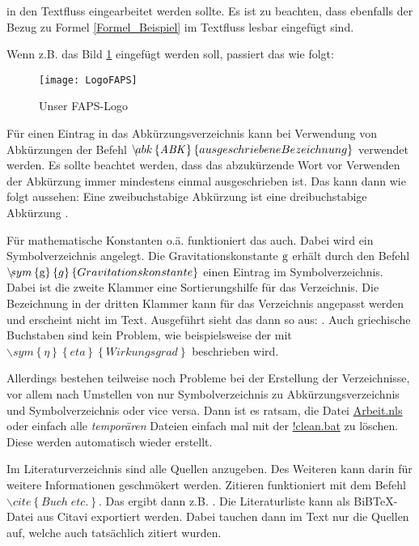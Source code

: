 in den Textfluss eingearbeitet werden sollte. Es ist zu beachten, dass ebenfalls der Bezug zu Formel
\eqref{Formel_Beispiel} im Textfluss lesbar eingefügt sind.

Wenn z.B. das Bild \ref{Bild_Beispiel} eingefügt werden soll, passiert das wie
folgt:
\begin{figure}[ht!]
	\centering
 	\texttt{[image: LogoFAPS]}
	\caption{Unser FAPS-Logo}
	\label{Bild_Beispiel}
\end{figure}

Für einen Eintrag in das Abkürzungsverzeichnis kann bei Verwendung von
Abkürzungen der Befehl $\backslash\!abk\left\{\text{\emph{ABK}}\right\}\left\{ausgeschriebene Bezeichnung\right\}$ verwendet werden. Es sollte
beachtet werden, dass das abzukürzende Wort vor Verwenden der Abkürzung immer
mindestens einmal ausgeschrieben ist.
Das kann dann wie folgt aussehen: Eine zweibuchstabige Abkürzung  ist eine dreibuchstabige Abkürzung .

Für mathematische Konstanten o.ä. funktioniert das auch. Dabei wird ein
Symbolverzeichnis angelegt. Die Gravitationskonstante $\textnormal{g}$ erhält durch
den Befehl $\backslash\!sym\left\{\textnormal{g}\right\}\left\{g\right\}\left\{Gravitationskonstante\right\}$ einen Eintrag im Symbolverzeichnis. Dabei ist die zweite Klammer eine Sortierungshilfe für das Verzeichnis. Die Bezeichnung in der dritten Klammer kann für das Verzeichnis angepasst werden und erscheint nicht im Text. Ausgeführt sieht das dann so aus: . Auch griechische Buchstaben sind kein Problem, wie beispielsweise der  mit $\backslash\!sym\left\{\eta\right\}\left\{eta\right\}\left\{Wirkungsgrad\right\}$ beschrieben wird.


Allerdings bestehen teilweise noch Probleme bei der Erstellung der
Verzeichnisse, vor allem nach Umstellen von nur Symbolverzeichnis zu
Abkürzungsverzeichnis und Symbolverzeichnis oder vice versa. Dann ist es ratsam,
die Datei \url{Arbeit.nls} oder einfach alle \emph{temporären} Dateien einfach mal mit der \url{!clean.bat} zu löschen. Diese werden automatisch wieder erstellt.

Im Literaturverzeichnis sind alle Quellen anzugeben. Des Weiteren kann darin für weitere Informationen geschmökert werden.
Zitieren funktioniert mit dem Befehl $\backslash\!cite\left\{ Buch\;etc.
\right\}$. Das ergibt dann z.B. \cite{Resetarics.2009}. Die Literaturliste kann als BiBTeX-Datei aus Citavi exportiert werden. Dabei tauchen dann im Text nur die Quellen auf, welche auch tatsächlich zitiert wurden.

